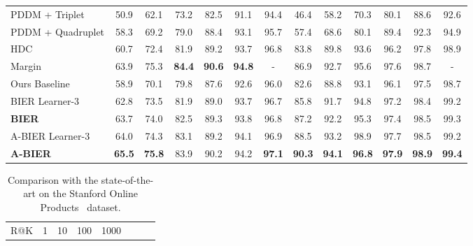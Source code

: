 \documentclass[10pt,journal,compsoc]{IEEEtran}
\begin{document}
\begin{table*}[!htbp]
\begin{tabular}{l|cccccc|cccccc}
        PDDM + Triplet \cite{huang2016local}           & 50.9 & 62.1 & 73.2 & 82.5 & 91.1 & 94.4                                       & 46.4 & 58.2 & 70.3 & 80.1 & 88.6 & 92.6  \\
        PDDM + Quadruplet \cite{huang2016local}        & 58.3 & 69.2 & 79.0 & 88.4 & 93.1 & 95.7                                       & 57.4 & 68.6 & 80.1 & 89.4 & 92.3 & 94.9  \\
        HDC~\cite{yuan2016hard}       & 60.7 & 72.4 & 81.9 & 89.2 & 93.7 & 96.8                                                        & 83.8 & 89.8 & 93.6 & 96.2 & 97.8 & 98.9 \\
        Margin~\cite{wu2017iccv}                       & 63.9  & 75.3 & \textbf{84.4} & \textbf{90.6} & \textbf{94.8} & -              & 86.9 & 92.7 & 95.6 & 97.6 & 98.7 & -    \\
        \hline
        Ours Baseline                                  &  58.9 & 70.1 & 79.8 & 87.6 & 92.6 & 96.0                                      & 82.6 & 88.8 & 93.1 & 96.1 & 97.5 & 98.7 \\
        BIER Learner-3~\cite{opitz2017bier}            &  62.8 & 73.5 & 81.9 & 89.0 & 93.7 & 96.7                                      & 85.8 & 91.7 & 94.8 & 97.2 & 98.4 & 99.2 \\
        \textbf{BIER}~\cite{opitz2017bier}             &  63.7 & 74.0 & 82.5 & 89.3 & 93.8 & 96.8                                      & 87.2 & 92.2 & 95.3 & 97.4 & 98.5 & 99.3 \\
        \hline
        A-BIER Learner-3                     & 64.0 & 74.3 & 83.1 & 89.2 & 94.1 & 96.9                                       & 88.5 & 93.2 & 98.9 & 97.7 & 98.5 & 99.2 \\
        \textbf{A-BIER}                      &  \textbf{65.5} & \textbf{75.8} & 83.9 & 90.2 & 94.2 & \textbf{97.1}           & \textbf{90.3} & \textbf{94.1} & \textbf{96.8} & \textbf{97.9} &  \textbf{98.9} & \textbf{99.4} \\
        \hline
    \end{tabular}
\end{table*}\begin{table*}[!htbp]
    \begin{minipage}[t]{0.5\textwidth}
    \renewcommand{\arraystretch}{1.3}
    \caption{Comparison with the state-of-the-art on the Stanford Online Products~\cite{oh2016deep} dataset.}
    \label{tbl:sota-products}
    \centering
    \begin{tabular}{l|ccccccc}
        \hline
        R@K                                            & 1     & 10     & 100    & 1000           \\

\end{tabular}
\end{minipage}
\end{table*}
\end{document}
